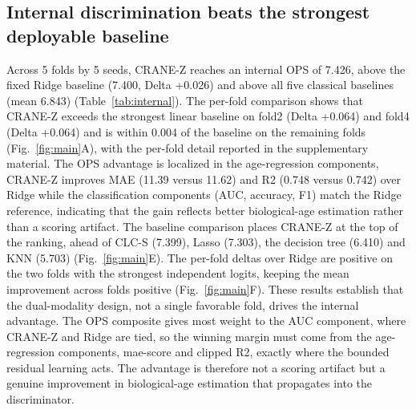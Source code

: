 \documentclass[11pt,a4paper]{article}
\begin{document}
\subsection{Internal discrimination beats the strongest deployable baseline}\label{sec:res1}
Across 5 folds by 5 seeds, CRANE-Z reaches an internal OPS of 7.426, above the fixed Ridge baseline (7.400, Delta +0.026) and above all five classical baselines (mean 6.843) (Table~\ref{tab:internal}). The per-fold comparison shows that CRANE-Z exceeds the strongest linear baseline on fold2 (Delta +0.064) and fold4 (Delta +0.064) and is within 0.004 of the baseline on the remaining folds (Fig.~\ref{fig:main}A), with the per-fold detail reported in the supplementary material. The OPS advantage is localized in the age-regression components, CRANE-Z improves MAE (11.39 versus 11.62) and R2 (0.748 versus 0.742) over Ridge while the classification components (AUC, accuracy, F1) match the Ridge reference, indicating that the gain reflects better biological-age estimation rather than a scoring artifact. The baseline comparison places CRANE-Z at the top of the ranking, ahead of CLC-S (7.399), Lasso (7.303), the decision tree (6.410) and KNN (5.703) (Fig.~\ref{fig:main}E). The per-fold deltas over Ridge are positive on the two folds with the strongest independent logits, keeping the mean improvement across folds positive (Fig.~\ref{fig:main}F). These results establish that the dual-modality design, not a single favorable fold, drives the internal advantage. The OPS composite gives most weight to the AUC component, where CRANE-Z and Ridge are tied, so the winning margin must come from the age-regression components, mae-score and clipped R2, exactly where the bounded residual learning acts. The advantage is therefore not a scoring artifact but a genuine improvement in biological-age estimation that propagates into the discriminator.
\end{document}
